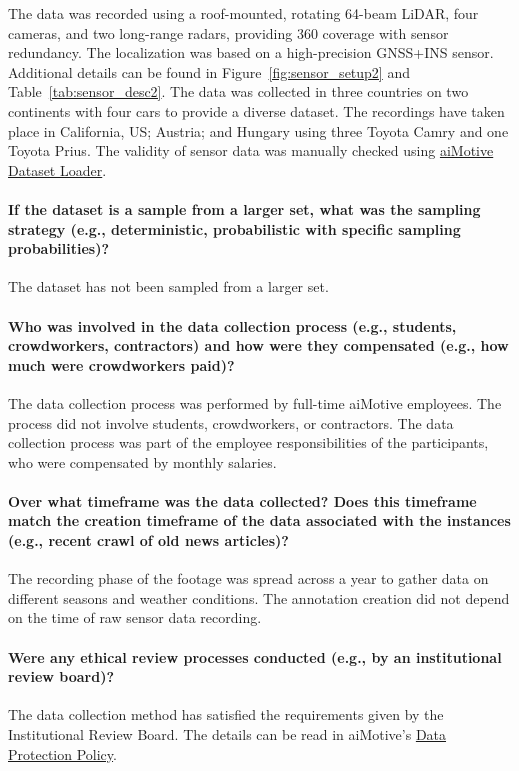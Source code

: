 \documentclass{article}
\begin{document}
The data was recorded using a roof-mounted, rotating 64-beam LiDAR, four cameras, and two long-range radars, providing 360 coverage with sensor redundancy. The localization was based on a high-precision GNSS+INS sensor. Additional details can be found in Figure~\ref{fig:sensor_setup2} and Table~\ref{tab:sensor_desc2}. The data was collected in three countries on two continents with four cars to provide a diverse dataset. The recordings have taken place in California, US; Austria; and Hungary using three Toyota Camry and one Toyota Prius. The validity of sensor data was manually checked using \href{https://github.com/aimotive/aimotive-dataset-loader}{aiMotive Dataset Loader}.

\paragraph{If the dataset is a sample from a larger set, what was the sampling strategy (e.g., deterministic, probabilistic with specific sampling probabilities)?} The dataset has not been sampled from a larger set.

\paragraph{Who was involved in the data collection process (e.g., students, crowdworkers, contractors) and how were they compensated (e.g., how much were crowdworkers paid)?} The data collection process was performed by full-time aiMotive employees. The process did not involve students, crowdworkers, or contractors. The data collection process was part of the employee responsibilities of the participants, who were compensated by monthly salaries.

\paragraph{Over what timeframe was the data collected? Does this timeframe match the creation timeframe of the data associated with the instances (e.g., recent crawl of old news articles)?} The recording phase of the footage was spread across a year to gather data on different seasons and weather conditions. The annotation creation did not depend on the time of raw sensor data recording.

\paragraph{Were any ethical review processes conducted (e.g., by an institutional review board)?} The data collection method has satisfied the requirements given by the Institutional Review Board. The details can be read in aiMotive's \href{https://aimotive.com/documents/d/guest/data-protection-policy-ai-development-5-august-2020-_en_hun_final}{Data Protection Policy}.
\end{document}
